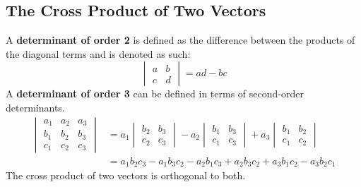 \documentclass[../Calculus_\Roman{3}]{subfiles}
\begin{document}
			\subsection*{The Cross Product of Two Vectors}
				A \textbf{determinant of order 2} is defined as the difference between the products of the diagonal terms and is denoted as such:
					\[\begin{vmatrix} a & b \\ c & d \end{vmatrix} = ad - bc\]
					A \textbf{determinant of order 3} can be defined in terms of second-order determinants.
					\begin{align*}
						\begin{vmatrix} 
							a_1 & a_2 & a_3 \\ 
							b_1 & b_2 & b_3 \\ 
							c_1 & c_2 & c_3 
						\end{vmatrix} &=
						a_1\begin{vmatrix}
							b_2 & b_3 \\
							c_2 & c_3
						\end{vmatrix} -
						a_2\begin{vmatrix}
							b_1 & b_3 \\
							c_1 & c_3
						\end{vmatrix} +
						a_3\begin{vmatrix}
							b_1 & b_2 \\
							c_1 & c_2
						\end{vmatrix} \\
							&= a_1b_2c_3 - a_1b_3c_2 - a_2b_1c_3 + a_2b_3c_2 + a_3b_1c_2 - a_3b_2c_1
					\end{align*}
					The cross product of two vectors is orthogonal to both. \\
\end{document}
